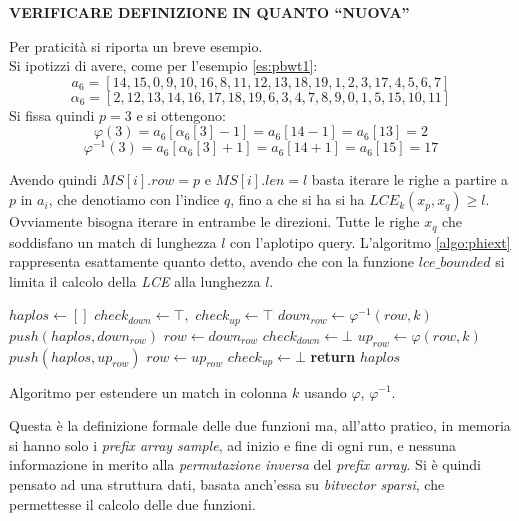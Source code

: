 \textbf{VERIFICARE DEFINIZIONE IN QUANTO ``NUOVA''}
\begin{esempio}
  Per praticità si riporta un breve esempio.\\
  Si ipotizzi di avere, come per l'esempio \ref{es:pbwt1}:
  \[a_6=[14,15,0,9,10,16,8,11,12,13,18,19,1,2,3,17,4,5,6,7]\]
  \[\alpha_6=[2,12,13,14,16,17,18,19,6,3,4,7,8,9,0,1,5,15,10,11]\]
  Si fissa quindi $p=3$ e si ottengono:
  \[\varphi(3)=a_6[\alpha_6[3]-1]=a_6[14-1]=a_6[13]=2\]
  \[\varphi^{-1}(3)=a_6[\alpha_6[3]+1]=a_6[14+1]=a_6[15]=17\]
\end{esempio}
Avendo quindi $MS[i].row=p$ e $MS[i].len=l$ basta iterare le righe a partire a
$p$ in $a_i$, che denotiamo con l'indice $q$, fino a che si ha si ha 
$LCE_k(x_p, x_q)\geq l$. Ovviamente bisogna iterare in entrambe le
direzioni. Tutte le righe $x_q$ che soddisfano un match di lunghezza $l$ con
l'aplotipo query. L'algoritmo \ref{algo:phiext} rappresenta esattamente quanto
detto, avendo che con la funzione $lce\_bounded$ si limita il calcolo della
\textit{LCE} alla lunghezza $l$.\\
\begin{algorithm}
  \begin{algorithmic}[1]
    \State $haplos\gets []$
    \State $check_{down}\gets \top,\,\,check_{up}\gets \top$
    \State $down_{row}\gets \varphi^{-1}(row, k)$
    \State $push(haplos, down_{row})$
    \State $row \gets down_{row}$
    \Else
    \State $check_{down}\gets \bot$
    \EndIf
    \EndWhile
    \State $up_{row}\gets \varphi(row, k)$
    \State $push(haplos, up_{row})$
    \State $row \gets up_{row}$
    \Else
    \State $check_{up}\gets \bot$
    \EndIf
    \EndWhile
    \State \textbf{return} $haplos$
    \EndFunction
  \end{algorithmic}
  \caption{Algoritmo per estendere un match in colonna $k$ usando $\varphi$,
  $\varphi^{-1}$.}
  \label{algo:phiext}
\end{algorithm}
Questa è la definizione formale delle due funzioni ma, all'atto pratico, in
memoria si hanno solo i \textit{prefix array sample}, ad inizio e fine di ogni
run, e nessuna informazione in merito alla \textit{permutazione inversa} del
\textit{prefix array}. Si è quindi pensato ad una struttura dati, basata
anch'essa su \textit{bitvector sparsi}, che permettesse il calcolo delle due
funzioni. 
